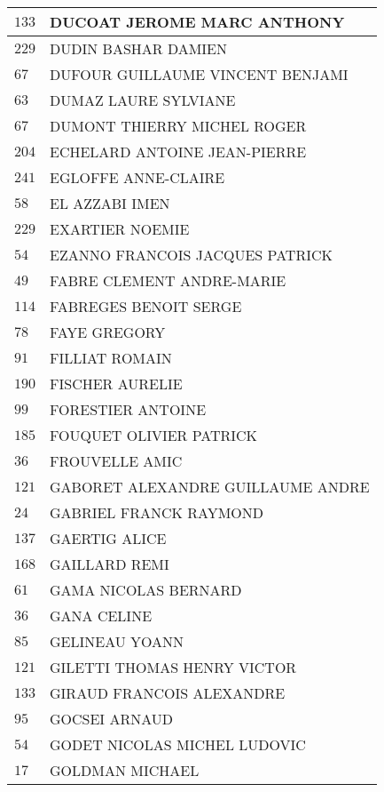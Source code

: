 \begin{xltabular}{\linewidth}{|l|X|}
    \hline
    $133$ & DUCOAT JEROME MARC ANTHONY \\
    \hline
    $229$ & DUDIN BASHAR DAMIEN \\
    \hline
    $67$ & DUFOUR GUILLAUME VINCENT BENJAMI \\
    \hline
    $63$ & DUMAZ LAURE SYLVIANE \\
    \hline
    $67$ & DUMONT THIERRY MICHEL ROGER \\
    \hline
    $204$ & ECHELARD ANTOINE JEAN-PIERRE \\
    \hline
    $241$ & EGLOFFE ANNE-CLAIRE \\
    \hline
    $58$ & EL AZZABI IMEN \\
    \hline
    $229$ & EXARTIER NOEMIE \\
    \hline
    $54$ & EZANNO FRANCOIS JACQUES PATRICK \\
    \hline
    $49$ & FABRE CLEMENT ANDRE-MARIE \\
    \hline
    $114$ & FABREGES BENOIT SERGE \\
    \hline
    $78$ & FAYE GREGORY \\
    \hline
    $91$ & FILLIAT ROMAIN \\
    \hline
    $190$ & FISCHER AURELIE \\
    \hline
    $99$ & FORESTIER ANTOINE \\
    \hline
    $185$ & FOUQUET OLIVIER PATRICK \\
    \hline
    $36$ & FROUVELLE AMIC \\
    \hline
    $121$ & GABORET ALEXANDRE GUILLAUME ANDRE \\
    \hline
    $24$ & GABRIEL FRANCK RAYMOND \\
    \hline
    $137$ & GAERTIG ALICE \\
    \hline
    $168$ & GAILLARD REMI \\
    \hline
    $61$ & GAMA NICOLAS BERNARD \\
    \hline
    $36$ & GANA CELINE \\
    \hline
    $85$ & GELINEAU YOANN \\
    \hline
    $121$ & GILETTI THOMAS HENRY VICTOR \\
    \hline
    $133$ & GIRAUD FRANCOIS ALEXANDRE \\
    \hline
    $95$ & GOCSEI ARNAUD \\
    \hline
    $54$ & GODET NICOLAS MICHEL LUDOVIC \\
    \hline
    $17$ & GOLDMAN MICHAEL \\
    \hline

\end{xltabular}

